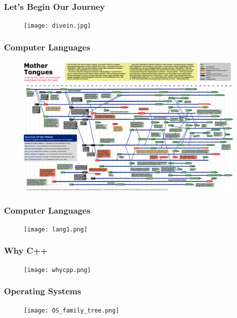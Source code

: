 \documentclass{beamer}
\begin{document}
\begin{frame}\frametitle{Let's Begin Our Journey}
\begin{figure}[h]
	\begin{center}	
	\texttt{[image: divein.jpg]}
	\end{center}
\end{figure}
\end{frame}


\begin{frame}\frametitle{Computer Languages}
\begin{figure}[h]
	\begin{center}	
	\includegraphics[scale=0.07]{ComputerLanguagesChart.png}
	\end{center}
\end{figure}
\end{frame}

\begin{frame}\frametitle{Computer Languages}
\begin{figure}[h]
	\begin{center}	
	\texttt{[image: lang1.png]}
	\end{center}
\end{figure}
\end{frame}

\begin{frame}\frametitle{Why C++}
\begin{figure}[h]
	\begin{center}	
	\texttt{[image: whycpp.png]}
	\end{center}
\end{figure}
\end{frame}

\begin{frame}\frametitle{Operating Systems}
\begin{figure}[h]
	\begin{center}	
	\texttt{[image: OS\_family\_tree.png]}
	\end{center}
\end{figure}
\end{frame}
\end{document}

